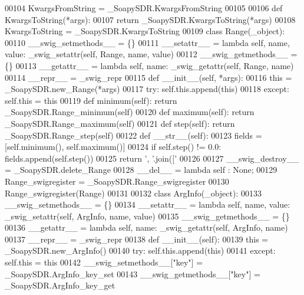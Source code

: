 \begin{DoxyCode}
{{00104 KwargsFromString = \_SoapySDR.KwargsFromString
00105 
00106 \textcolor{keyword}{def }KwargsToString(*args):
00107   \textcolor{keywordflow}{return} \_SoapySDR.KwargsToString(*args)
00108 KwargsToString = \_SoapySDR.KwargsToString
00109 \textcolor{keyword}{class }Range(_object):
00110     \_\_swig\_setmethods\_\_ = \{\}
00111     \_\_setattr\_\_ = \textcolor{keyword}{lambda} self, name, value: _swig_setattr(self, Range, name, value)
00112     \_\_swig\_getmethods\_\_ = \{\}
00113     \_\_getattr\_\_ = \textcolor{keyword}{lambda} self, name: _swig_getattr(self, Range, name)
00114     \_\_repr\_\_ = \_swig\_repr
00115     \textcolor{keyword}{def }__init__(self, *args): 
00116         this = \_SoapySDR.new\_Range(*args)
00117         \textcolor{keywordflow}{try}: self.this.append(this)
00118         \textcolor{keywordflow}{except}: self.this = this
00119     \textcolor{keyword}{def }minimum(self): \textcolor{keywordflow}{return} \_SoapySDR.Range\_minimum(self)
00120     \textcolor{keyword}{def }maximum(self): \textcolor{keywordflow}{return} \_SoapySDR.Range\_maximum(self)
00121     \textcolor{keyword}{def }step(self): \textcolor{keywordflow}{return} \_SoapySDR.Range\_step(self)
00122     \textcolor{keyword}{def }__str__(self):
00123         fields = [self.minimum(), self.maximum()]
00124         \textcolor{keywordflow}{if} self.step() != 0.0: fields.append(self.step())
00125         \textcolor{keywordflow}{return} \textcolor{stringliteral}{', '}.join([\textcolor{stringliteral}{'%
00126 
00127     \_\_swig\_destroy\_\_ = \_SoapySDR.delete\_Range
00128     \_\_del\_\_ = \textcolor{keyword}{lambda} self : \textcolor{keywordtype}{None};
00129 Range\_swigregister = \_SoapySDR.Range\_swigregister
00130 Range_swigregister(Range)
00131 
00132 \textcolor{keyword}{class }ArgInfo(_object):
00133     \_\_swig\_setmethods\_\_ = \{\}
00134     \_\_setattr\_\_ = \textcolor{keyword}{lambda} self, name, value: _swig_setattr(self, ArgInfo, name, value)
00135     \_\_swig\_getmethods\_\_ = \{\}
00136     \_\_getattr\_\_ = \textcolor{keyword}{lambda} self, name: _swig_getattr(self, ArgInfo, name)
00137     \_\_repr\_\_ = \_swig\_repr
00138     \textcolor{keyword}{def }__init__(self): 
00139         this = \_SoapySDR.new\_ArgInfo()
00140         \textcolor{keywordflow}{try}: self.this.append(this)
00141         \textcolor{keywordflow}{except}: self.this = this
00142     \_\_swig\_setmethods\_\_[\textcolor{stringliteral}{"key"}] = \_SoapySDR.ArgInfo\_key\_set
00143     \_\_swig\_getmethods\_\_[\textcolor{stringliteral}{"key"}] = \_SoapySDR.ArgInfo\_key\_get
}}}
\end{DoxyCode}
